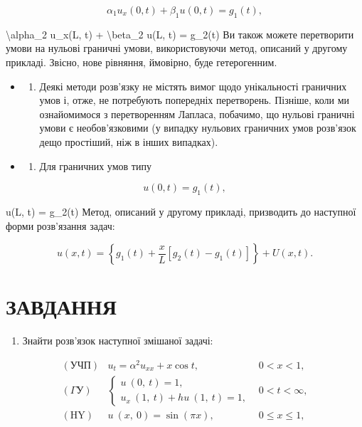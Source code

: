 \documentclass[
]{article}
\providecommand{\tightlist}{%
  \setlength{\itemsep}{0pt}\setlength{\parskip}{0pt}}
\begin{document}
\[
\alpha_1 u_x(0, t) + \beta_1 u(0, t) = g_1(t),
\]

\textbackslash alpha\_2 u\_x(L, t) + \textbackslash beta\_2 u(L, t) =
g\_2(t) Ви також можете перетворити умови на нульові граничні умови,
використовуючи метод, описаний у другому прикладі. Звісно, нове
рівняння, ймовірно, буде гетерогенним.

\begin{itemize}
\tightlist
\item
  \begin{enumerate}
  \def\labelenumi{\arabic{enumi}.}
  \setcounter{enumi}{2}
  \tightlist
  \item
    Деякі методи розв'язку не містять вимог щодо унікальності граничних
    умов і, отже, не потребують попередніх перетворень. Пізніше, коли ми
    ознайомимося з перетворенням Лапласа, побачимо, що нульові граничні
    умови є необов'язковими (у випадку нульових граничних умов розв'язок
    дещо простіший, ніж в інших випадках).
  \end{enumerate}
\item
  \begin{enumerate}
  \def\labelenumi{\arabic{enumi}.}
  \setcounter{enumi}{3}
  \tightlist
  \item
    Для граничних умов типу
  \end{enumerate}
\end{itemize}

\[
u(0, t) = g_1(t),
\]

u(L, t) = g\_2(t) Метод, описаний у другому прикладі, призводить до
наступної форми розв'язання задач:

\[
u(x, t) = \left\{ g_1(t) + \frac{x}{L} \left[ g_2(t) - g_1(t) \right] \right\} + U(x, t).
\]

\section{ЗАВДАННЯ}\label{ux437ux430ux432ux434ux430ux43dux43dux44f-1}

\begin{enumerate}
\def\labelenumi{\arabic{enumi}.}
\tightlist
\item
  Знайти розв'язок наступної змішаної задачі:
\end{enumerate}

\[
\begin{aligned} (\text{УЧП}) & u_t = \alpha^2 u_{xx} + x \cos t, & 0 < x < 1, \\ (\Gamma \text{У}) & \begin{cases} u \ (0, \ t) = 1, \\ u_x \ (1, \ t) + hu \ (1, \ t) = 1, \end{cases} & 0 < t < \infty, \\ (\text{HY}) & u \ (x, \ 0) = \sin (\pi x), & 0 \leqslant x \leqslant 1, \end{aligned}
\]
\end{document}
